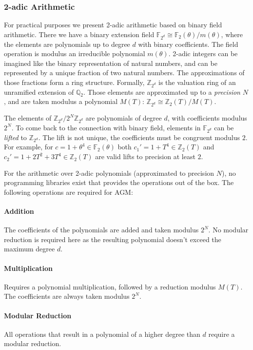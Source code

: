 \documentclass[11pt,english]{article}
\begin{document}
\subsubsection{2-adic Arithmetic}
For practical purposes we present 2-adic arithmetic based on binary field arithmetic. There we have a binary extension field $\mathbb{F}_{2^d}\cong \mathbb{F}_2(\theta)/m(\theta)$, where the elements are polynomials up to degree $d$ with binary coefficients. The field operation is modulus an irreducible polynomial $m(\theta)$. 2-adic integers can be imagined like the binary representation of natural numbers, and can be represented by a unique fraction of two natural numbers. The approximations of those fractions form a ring structure. Formally, $\mathbb{Z}_{2^d}$ is the valuation ring of an unramified extension of $\mathbb{Q}_2$. Those elements are approximated up to a \emph{precision} $N$, and are taken modulus a polynomial $M(T)$: $\mathbb{Z}_{2^d}\cong \mathbb{Z}_2(T)/M(T)$.

The elements of $\mathbb{Z}_{2^d}/2^N\mathbb{Z}_{2^d}$ are polynomials of degree $d$, with coefficients modulus $2^N$. To come back to the connection with binary field, elements in $\mathbb{F}_{2^d}$ can be \emph{lifted} to $\mathbb{Z}_{2^d}$. The lift is not unique, the coefficients must be congruent modulus $2$. For example, for $c=1+\theta^4\in \mathbb{F}_{2}(\theta)$ both $c_1'=1+T^4\in\mathbb{Z}_{2}(T)$ and $c_2'=1+2T^2+3T^4\in\mathbb{Z}_{2}(T)$ are valid lifts to precision at least $2$.

For the arithmetic over 2-adic polynomials (approximated to precision $N$), no programming libraries exist that provides the operations out of the box. The following operations are required for AGM:

\paragraph{Addition}
The coefficients of the polynomials are added and taken modulus $2^N$. No modular reduction is required here as the resulting polynomial doesn't exceed the maximum degree $d$.
\paragraph{Multiplication}
Requires a polynomial multiplication, followed by a reduction modulus $M(T)$. The coefficients are always taken modulus $2^N$.
\paragraph{Modular Reduction}
All operations that result in a polynomial of a higher degree than $d$ require a modular reduction.
\end{document}
